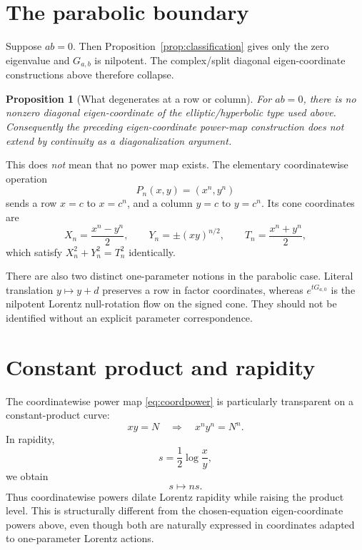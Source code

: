 \documentclass[11pt]{amsart}
\newtheorem{proposition}[theorem]{Proposition}
\theoremstyle{remark}
\begin{document}
\section{The parabolic boundary}

Suppose $ab=0$.  Then Proposition~\ref{prop:classification} gives only the zero eigenvalue and $G_{a,b}$ is nilpotent.  The complex/split diagonal eigen-coordinate constructions above therefore collapse.

\begin{proposition}[What degenerates at a row or column]\label{prop:parabolic}
For $ab=0$, there is no nonzero diagonal eigen-coordinate of the elliptic/hyperbolic type used above.  Consequently the preceding eigen-coordinate power-map construction does not extend by continuity as a diagonalization argument.
\end{proposition}

This does \emph{not} mean that no power map exists.  The elementary coordinatewise operation
\begin{equation}\label{eq:coordpower}
\boxed{P_n(x,y)=(x^n,y^n)}
\end{equation}
sends a row $x=c$ to $x=c^n$, and a column $y=c$ to $y=c^n$.  Its cone coordinates are
\[
X_n=\frac{x^n-y^n}{2},
\qquad
Y_n=\pm(xy)^{n/2},
\qquad
T_n=\frac{x^n+y^n}{2},
\]
which satisfy $X_n^2+Y_n^2=T_n^2$ identically.

There are also two distinct one-parameter notions in the parabolic case.  Literal translation $y\mapsto y+d$ preserves a row in factor coordinates, whereas $e^{tG_{a,0}}$ is the nilpotent Lorentz null-rotation flow on the signed cone.  They should not be identified without an explicit parameter correspondence.

\section{Constant product and rapidity}

The coordinatewise power map \eqref{eq:coordpower} is particularly transparent on a constant-product curve:
\[
xy=N
\quad\Longrightarrow\quad
x^ny^n=N^n.
\]
In rapidity,
\[
s=\frac12\log\frac{x}{y},
\]
we obtain
\begin{equation}\label{eq:rapiditypower}
\boxed{s\mapsto ns.}
\end{equation}
Thus coordinatewise powers dilate Lorentz rapidity while raising the product level.  This is structurally different from the chosen-equation eigen-coordinate powers above, even though both are naturally expressed in coordinates adapted to one-parameter Lorentz actions.
\end{document}
